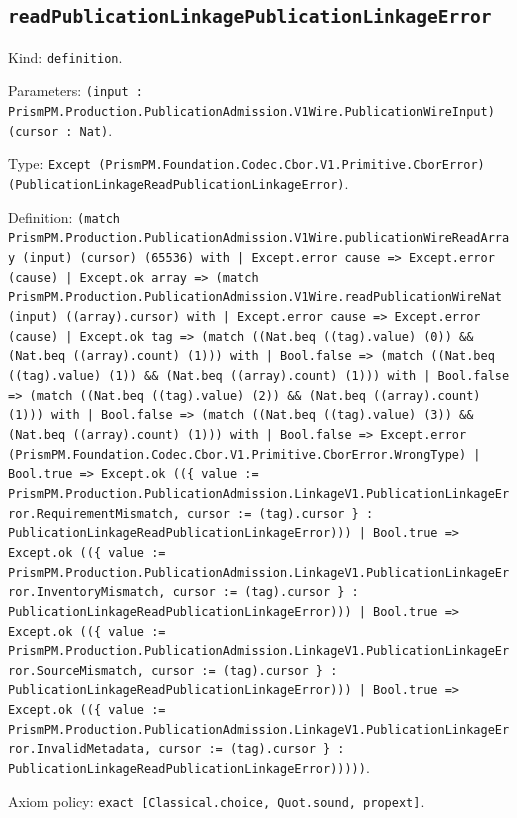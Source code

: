 \documentclass[11pt]{article}
\begin{document}
\subsection*{\texttt{readPublicationLinkagePublicationLinkageError}}
\noindent Kind: \texttt{definition}.\par
\noindent Parameters: \texttt{(input : PrismPM.Production.PublicationAdmission.V1Wire.PublicationWireInput) (cursor : Nat)}.\par
\noindent Type: \texttt{Except (PrismPM.Foundation.Codec.Cbor.V1.Primitive.CborError) (PublicationLinkageReadPublicationLinkageError)}.\par
\noindent Definition: \texttt{(match PrismPM.Production.PublicationAdmission.V1Wire.publicationWireReadArray (input) (cursor) (65536) with | Except.error cause => Except.error (cause) | Except.ok array => (match PrismPM.Production.PublicationAdmission.V1Wire.readPublicationWireNat (input) ((array).cursor) with | Except.error cause => Except.error (cause) | Except.ok tag => (match ((Nat.beq ((tag).value) (0)) \&\& (Nat.beq ((array).count) (1))) with | Bool.false => (match ((Nat.beq ((tag).value) (1)) \&\& (Nat.beq ((array).count) (1))) with | Bool.false => (match ((Nat.beq ((tag).value) (2)) \&\& (Nat.beq ((array).count) (1))) with | Bool.false => (match ((Nat.beq ((tag).value) (3)) \&\& (Nat.beq ((array).count) (1))) with | Bool.false => Except.error (PrismPM.Foundation.Codec.Cbor.V1.Primitive.CborError.WrongType) | Bool.true => Except.ok ((\{ value := PrismPM.Production.PublicationAdmission.LinkageV1.PublicationLinkageError.RequirementMismatch, cursor := (tag).cursor \} : PublicationLinkageReadPublicationLinkageError))) | Bool.true => Except.ok ((\{ value := PrismPM.Production.PublicationAdmission.LinkageV1.PublicationLinkageError.InventoryMismatch, cursor := (tag).cursor \} : PublicationLinkageReadPublicationLinkageError))) | Bool.true => Except.ok ((\{ value := PrismPM.Production.PublicationAdmission.LinkageV1.PublicationLinkageError.SourceMismatch, cursor := (tag).cursor \} : PublicationLinkageReadPublicationLinkageError))) | Bool.true => Except.ok ((\{ value := PrismPM.Production.PublicationAdmission.LinkageV1.PublicationLinkageError.InvalidMetadata, cursor := (tag).cursor \} : PublicationLinkageReadPublicationLinkageError)))))}.\par
\noindent Axiom policy: \texttt{exact [Classical.choice, Quot.sound, propext]}.\par
\end{document}
